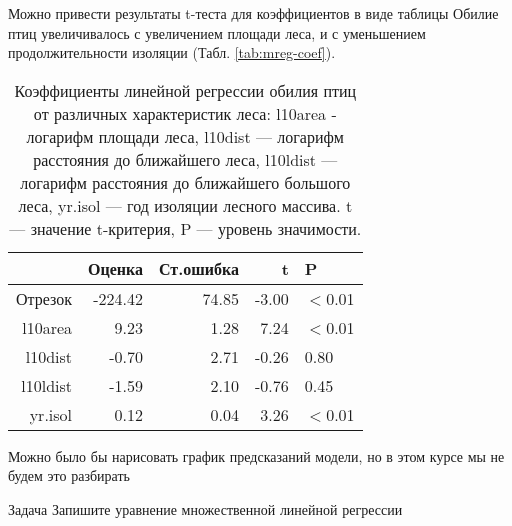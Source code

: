 \documentclass[
  ignorenonframetext,
  t,xcolor=table]{beamer}
\begin{document}
\begin{frame}{Можно привести результаты t-теста для коэффициентов в виде
таблицы}
\protect\hypertarget{ux43cux43eux436ux43dux43e-ux43fux440ux438ux432ux435ux441ux442ux438-ux440ux435ux437ux443ux43bux44cux442ux430ux442ux44b-t-ux442ux435ux441ux442ux430-ux434ux43bux44f-ux43aux43eux44dux444ux444ux438ux446ux438ux435ux43dux442ux43eux432-ux432-ux432ux438ux434ux435-ux442ux430ux431ux43bux438ux446ux44b}{}
Обилие птиц увеличивалось с увеличением площади леса, и с уменьшением
продолжительности изоляции (Табл. \autoref{tab:mreg-coef}).

\begin{table}[ht]
\centering
\caption{Коэффициенты линейной регрессии обилия птиц от различных характеристик леса: l10area - логарифм площади леса, l10dist --- логарифм расстояния до ближайшего леса, l10ldist --- логарифм расстояния до ближайшего большого леса, yr.isol --- год изоляции лесного массива. t --- значение t-критерия, P --- уровень значимости.} 
\label{tab:mreg-coef}
\begin{tabular}{rrrrl}
  \hline
 & Оценка & Ст.ошибка & t & P \\ 
  \hline
Отрезок & -224.42 & 74.85 & -3.00 & $<$0.01 \\ 
  l10area & 9.23 & 1.28 & 7.24 & $<$0.01 \\ 
  l10dist & -0.70 & 2.71 & -0.26 & 0.80 \\ 
  l10ldist & -1.59 & 2.10 & -0.76 & 0.45 \\ 
  yr.isol & 0.12 & 0.04 & 3.26 & $<$0.01 \\ 
   \hline
\end{tabular}
\end{table}

Можно было бы нарисовать график предсказаний модели, но в этом курсе мы
не будем это разбирать
\end{frame}

\begin{frame}{Задача}
\protect\hypertarget{ux437ux430ux434ux430ux447ux430-1}{}
Запишите уравнение множественной линейной регрессии
\end{frame}
\end{document}
